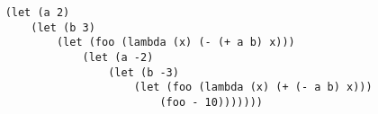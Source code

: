 \begin{verbatim}
    (let (a 2)
        (let (b 3)
            (let (foo (lambda (x) (- (+ a b) x)))
                (let (a -2)
                    (let (b -3)
                        (let (foo (lambda (x) (+ (- a b) x)))
                            (foo - 10)))))))
\end{verbatim}

